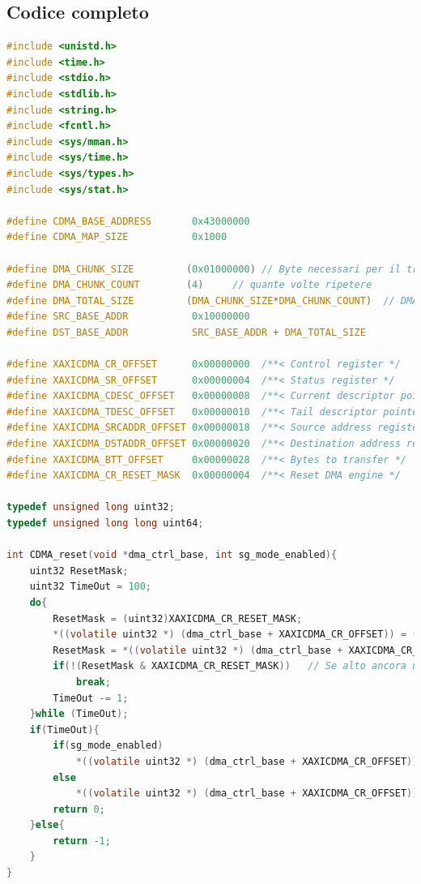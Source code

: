 \subsection{Codice completo}
\begin{lstlisting}[language=c, label=lst:sh, caption={Codice completo test CDMA}]
#include <unistd.h>
#include <time.h>
#include <stdio.h>
#include <stdlib.h>
#include <string.h>
#include <fcntl.h>
#include <sys/mman.h>
#include <sys/time.h>
#include <sys/types.h>
#include <sys/stat.h>

#define CDMA_BASE_ADDRESS       0x43000000
#define CDMA_MAP_SIZE           0x1000

#define DMA_CHUNK_SIZE         (0x01000000) // Byte necessari per il trasferimento
#define DMA_CHUNK_COUNT        (4)     // quante volte ripetere
#define DMA_TOTAL_SIZE         (DMA_CHUNK_SIZE*DMA_CHUNK_COUNT)  // DMA_TOTAL_SIZE*2 NON DEVE essere maggiore della dimensione di DDR
#define SRC_BASE_ADDR           0x10000000		
#define DST_BASE_ADDR           SRC_BASE_ADDR + DMA_TOTAL_SIZE

#define XAXICDMA_CR_OFFSET      0x00000000  /**< Control register */
#define XAXICDMA_SR_OFFSET      0x00000004  /**< Status register */
#define XAXICDMA_CDESC_OFFSET   0x00000008  /**< Current descriptor pointer */
#define XAXICDMA_TDESC_OFFSET   0x00000010  /**< Tail descriptor pointer */
#define XAXICDMA_SRCADDR_OFFSET 0x00000018  /**< Source address register */
#define XAXICDMA_DSTADDR_OFFSET 0x00000020  /**< Destination address register */
#define XAXICDMA_BTT_OFFSET     0x00000028  /**< Bytes to transfer */
#define XAXICDMA_CR_RESET_MASK  0x00000004  /**< Reset DMA engine */

typedef unsigned long uint32;
typedef unsigned long long uint64;

int CDMA_reset(void *dma_ctrl_base, int sg_mode_enabled){
    uint32 ResetMask;
    uint32 TimeOut = 100;
    do{
        ResetMask = (uint32)XAXICDMA_CR_RESET_MASK;
        *((volatile uint32 *) (dma_ctrl_base + XAXICDMA_CR_OFFSET)) = (uint32)ResetMask;
        ResetMask = *((volatile uint32 *) (dma_ctrl_base + XAXICDMA_CR_OFFSET));
        if(!(ResetMask & XAXICDMA_CR_RESET_MASK))   // Se alto ancora non pronto
            break;
        TimeOut -= 1;
    }while (TimeOut);
    if(TimeOut){
        if(sg_mode_enabled)
            *((volatile uint32 *) (dma_ctrl_base + XAXICDMA_CR_OFFSET)) |=  0x00000008;
        else
            *((volatile uint32 *) (dma_ctrl_base + XAXICDMA_CR_OFFSET)) &= ~0x00000008;
        return 0;
    }else{
        return -1;
    }
}


\end{lstlisting}
